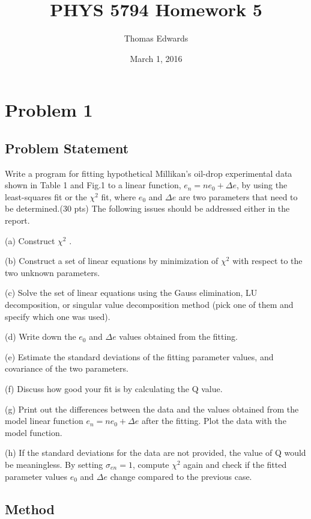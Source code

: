 \documentclass[10pt,letter]{article}
\begin{document}
\begin{titlepage}
\title{PHYS 5794 Homework 5}
\date{March 1, 2016}
\author{Thomas Edwards}
\maketitle
\end{titlepage}

\section{Problem 1}

\subsection{Problem Statement}Write a program for fitting hypothetical Millikan’s oil-drop experimental data shown in Table 1 and
Fig.1 to a linear function, $e_n = n e_0 + \Delta e$, by using the least-squares fit or the $\chi^2$ fit, where $e_0$ and
$\Delta e$ are two parameters that need to be determined.(30 pts)
The following issues should be addressed either in the report.

(a) Construct $\chi^2$ .

(b) Construct a set of linear equations by minimization of $\chi^2$ with respect to the two unknown
parameters.

(c) Solve the set of linear equations using the Gauss elimination, LU decomposition, or singular
value decomposition method (pick one of them and specify which one was used).

(d) Write down the $e_0$  and $\Delta e$ values obtained from the fitting.

(e) Estimate the standard deviations of the fitting parameter values, and covariance of the two
parameters.

(f) Discuss how good your fit is by calculating the Q value.

(g) Print out the differences between the data and the values obtained from the model linear
function  $e_n = n e_0 + \Delta e$ after the fitting. Plot the data with the model function.

(h) If the standard deviations for the data are not provided, the value of Q would be
meaningless. By setting $\sigma_{en} =1$, compute $\chi^2$ again and check if the fitted parameter values $e_0$ and $\Delta e$ change compared to the previous case.

\subsection{Method}
\end{document}
